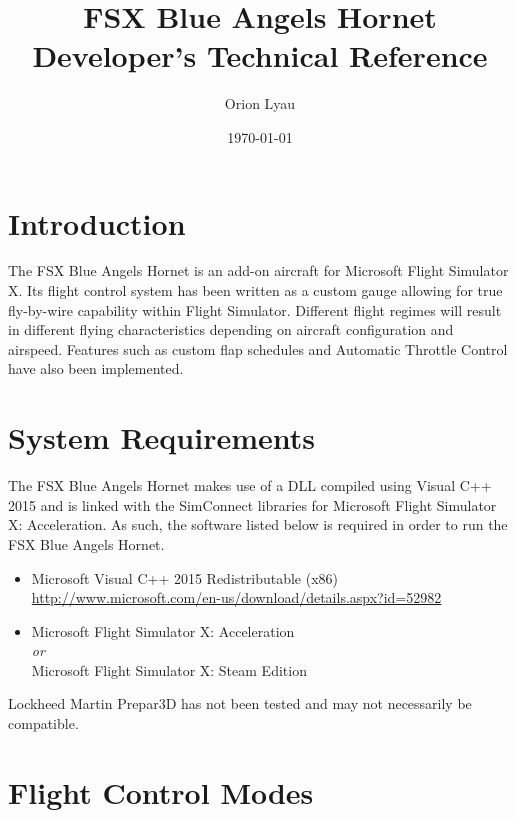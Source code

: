 \documentclass[11pt]{article}
\title{%
  FSX Blue Angels Hornet \\
  \large Developer's Technical Reference}
\author{Orion Lyau}
\date{\today}
\begin{document}
\maketitle

\pagebreak

\tableofcontents

\pagebreak

\section{Introduction}

The FSX Blue Angels Hornet is an add-on aircraft for Microsoft Flight Simulator X.  Its flight control system has been written as a custom gauge allowing for true fly-by-wire capability within Flight Simulator.  Different flight regimes will result in different flying characteristics depending on aircraft configuration and airspeed.  Features such as custom flap schedules and Automatic Throttle Control have also been implemented.

\section{System Requirements}

The FSX Blue Angels Hornet makes use of a DLL compiled using Visual C++ 2015 and is linked with the SimConnect libraries for Microsoft Flight Simulator X: Acceleration.  As such, the software listed below is required in order to run the FSX Blue Angels Hornet.

\begin{itemize}
\item Microsoft Visual C++ 2015 Redistributable (x86) \\ \url{http://www.microsoft.com/en-us/download/details.aspx?id=52982}
\item Microsoft Flight Simulator X: Acceleration \\ \textit{or} \\ Microsoft Flight Simulator X: Steam Edition
\end{itemize}

\noindent Lockheed Martin Prepar3D has not been tested and may not necessarily be compatible.

\pagebreak

\pagebreak
\section{Flight Control Modes}
\end{document}
